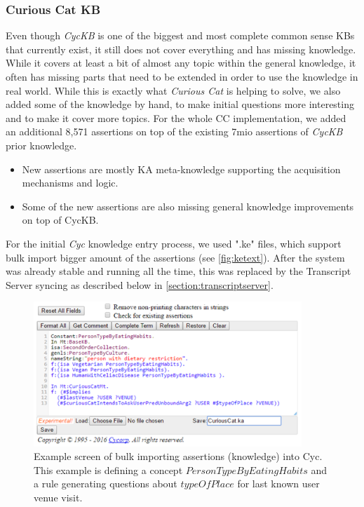 \subsubsection{Curious Cat KB}
\label{section:cckb}
Even though \emph{CycKB} is one of the biggest and most complete common sense 
KBs that currently exist, it still does not cover everything and has missing 
knowledge. While it covers at least a bit of almost any topic within the general
knowledge, it often has missing parts that need to be extended in order to use
the knowledge in real world. While this is exactly what \emph{Curious Cat} is
helping to solve, we also added some of the knowledge by hand, to make initial
questions more interesting and to make it cover more topics. For the whole CC
implementation, we added an additional 8,571 assertions on top of the existing 
7mio assertions of \emph{CycKB} prior knowledge.
\begin{itemize}
\item New assertions are mostly KA meta-knowledge supporting the acquisition
mechanisms and logic.
\item Some of the new assertions are also missing general knowledge 
improvements on top of CycKB.
\end{itemize}

For the initial \emph{Cyc} knowledge entry process, we used ".ke" files, 
which support bulk import bigger amount of the assertions (see 
\autoref{fig:ketext}). After the system was already stable and running all the
time, this was replaced by the Transcript Server syncing as described below
in \autoref{section:transcriptserver}.

\begin{figure}[H]
	\centering
		\includegraphics[width=0.9\textwidth]{figures/keEntry.png}
	\caption{Example screen of bulk importing assertions (knowledge) into Cyc.
This example is defining a concept $PersonTypeByEatingHabits$ and a rule 
generating questions about $typeOfPlace$ for last known user venue visit.}
	\label{fig:ketext}
\end{figure}

